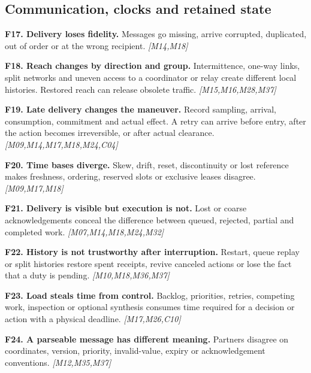 \documentclass[11pt]{article}
\newcommand{\f}[4]{\par\smallskip\noindent\textbf{#1. #2.} #3 \textit{[#4]}\par}
\begin{document}
\subsection{Communication, clocks and retained state}
\f{F17}{Delivery loses fidelity}{Messages go missing, arrive corrupted, duplicated, out of order or at the wrong recipient.}{M14,M18}
\f{F18}{Reach changes by direction and group}{Intermittence, one-way links, split networks and uneven access to a coordinator or relay create different local histories. Restored reach can release obsolete traffic.}{M15,M16,M28,M37}
\f{F19}{Late delivery changes the maneuver}{Record sampling, arrival, consumption, commitment and actual effect. A retry can arrive before entry, after the action becomes irreversible, or after actual clearance.}{M09,M14,M17,M18,M24,C04}
\f{F20}{Time bases diverge}{Skew, drift, reset, discontinuity or lost reference makes freshness, ordering, reserved slots or exclusive leases disagree.}{M09,M17,M18}
\f{F21}{Delivery is visible but execution is not}{Lost or coarse acknowledgements conceal the difference between queued, rejected, partial and completed work.}{M07,M14,M18,M24,M32}
\f{F22}{History is not trustworthy after interruption}{Restart, queue replay or split histories restore spent receipts, revive canceled actions or lose the fact that a duty is pending.}{M10,M18,M36,M37}
\f{F23}{Load steals time from control}{Backlog, priorities, retries, competing work, inspection or optional synthesis consumes time required for a decision or action with a physical deadline.}{M17,M26,C10}
\f{F24}{A parseable message has different meaning}{Partners disagree on coordinates, version, priority, invalid-value, expiry or acknowledgement conventions.}{M12,M35,M37}
\end{document}
